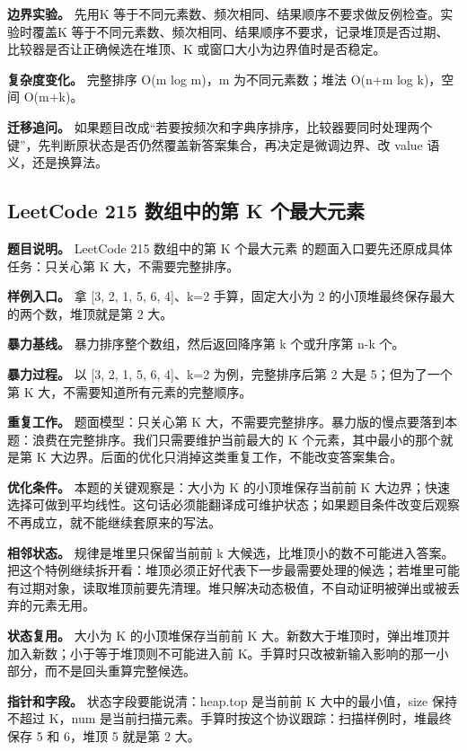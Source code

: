 \textbf{边界实验。} 先用K 等于不同元素数、频次相同、结果顺序不要求做反例检查。实验时覆盖K 等于不同元素数、频次相同、结果顺序不要求，记录堆顶是否过期、比较器是否让正确候选在堆顶、K 或窗口大小为边界值时是否稳定。

\textbf{复杂度变化。} 完整排序 O(m log m)，m 为不同元素数；堆法 O(n+m log k)，空间 O(m+k)。

\textbf{迁移追问。} 如果题目改成“若要按频次和字典序排序，比较器要同时处理两个键”，先判断原状态是否仍然覆盖新答案集合，再决定是微调边界、改 value 语义，还是换算法。

\subsection{LeetCode 215 数组中的第 K 个最大元素}

\textbf{题目说明。} LeetCode 215 数组中的第 K 个最大元素 的题面入口要先还原成具体任务：只关心第 K 大，不需要完整排序。

\textbf{样例入口。} 拿 [3, 2, 1, 5, 6, 4]、k=2 手算，固定大小为 2 的小顶堆最终保存最大的两个数，堆顶就是第 2 大。

\textbf{暴力基线。} 暴力排序整个数组，然后返回降序第 k 个或升序第 n-k 个。

\textbf{暴力过程。} 以 [3, 2, 1, 5, 6, 4]、k=2 为例，完整排序后第 2 大是 5；但为了一个第 K 大，不需要知道所有元素的完整顺序。

\textbf{重复工作。} 题面模型：只关心第 K 大，不需要完整排序。暴力版的慢点要落到本题：浪费在完整排序。我们只需要维护当前最大的 K 个元素，其中最小的那个就是第 K 大边界。后面的优化只消掉这类重复工作，不能改变答案集合。

\textbf{优化条件。} 本题的关键观察是：大小为 K 的小顶堆保存当前前 K 大边界；快速选择可做到平均线性。这句话必须能翻译成可维护状态；如果题目条件改变后观察不再成立，就不能继续套原来的写法。

\textbf{相邻状态。} 规律是堆里只保留当前前 k 大候选，比堆顶小的数不可能进入答案。把这个特例继续拆开看：堆顶必须正好代表下一步最需要处理的候选；若堆里可能有过期对象，读取堆顶前要先清理。堆只解决动态极值，不自动证明被弹出或被丢弃的元素无用。

\textbf{状态复用。} 大小为 K 的小顶堆保存当前前 K 大。新数大于堆顶时，弹出堆顶并加入新数；小于等于堆顶则不可能进入前 K。手算时只改被新输入影响的那一小部分，而不是回头重算完整候选。

\textbf{指针和字段。} 状态字段要能说清：heap.top 是当前前 K 大中的最小值，size 保持不超过 K，num 是当前扫描元素。手算时按这个协议跟踪：扫描样例时，堆最终保存 5 和 6，堆顶 5 就是第 2 大。

